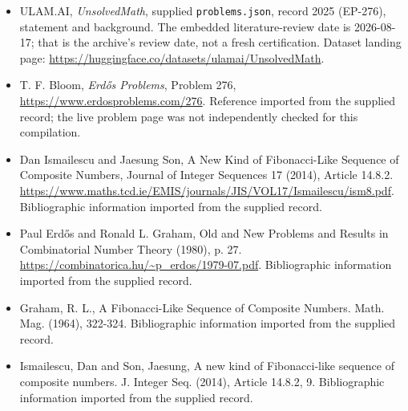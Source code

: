 \documentclass[11pt,a4paper]{article}
\begin{document}
{\small

\begin{itemize}

\item[\hypertarget{source:2025:1}{S1}] ULAM.AI, \emph{UnsolvedMath}, supplied \texttt{problems.json}, record 2025 (EP-276), statement and background. The embedded literature-review date is 2026-08-17; that is the archive’s review date, not a fresh certification. Dataset landing page: \url{https://huggingface.co/datasets/ulamai/UnsolvedMath}.

\item[\hypertarget{source:2025:2}{S2}] T. F. Bloom, \emph{Erdős Problems}, Problem 276, \url{https://www.erdosproblems.com/276}. Reference imported from the supplied record; the live problem page was not independently checked for this compilation.

\item[\hypertarget{source:2025:3}{S3}] Dan Ismailescu and Jaesung Son, A New Kind of Fibonacci-Like Sequence of Composite Numbers, Journal of Integer Sequences 17 (2014), Article 14.8.2. \url{https://www.maths.tcd.ie/EMIS/journals/JIS/VOL17/Ismailescu/ism8.pdf}. Bibliographic information imported from the supplied record.

\item[\hypertarget{source:2025:4}{S4}] Paul Erdős and Ronald L. Graham, Old and New Problems and Results in Combinatorial Number Theory (1980), p. 27. \url{https://combinatorica.hu/~p_erdos/1979-07.pdf}. Bibliographic information imported from the supplied record.

\item[\hypertarget{source:2025:5}{S5}] Graham, R. L., A Fibonacci-Like Sequence of Composite Numbers. Math. Mag. (1964), 322-324. Bibliographic information imported from the supplied record.

\item[\hypertarget{source:2025:6}{S6}] Ismailescu, Dan and Son, Jaesung, A new kind of {F}ibonacci-like sequence of composite numbers. J. Integer Seq. (2014), Article 14.8.2, 9. Bibliographic information imported from the supplied record.

\end{itemize}

}

\label{end:2025}
\end{document}
